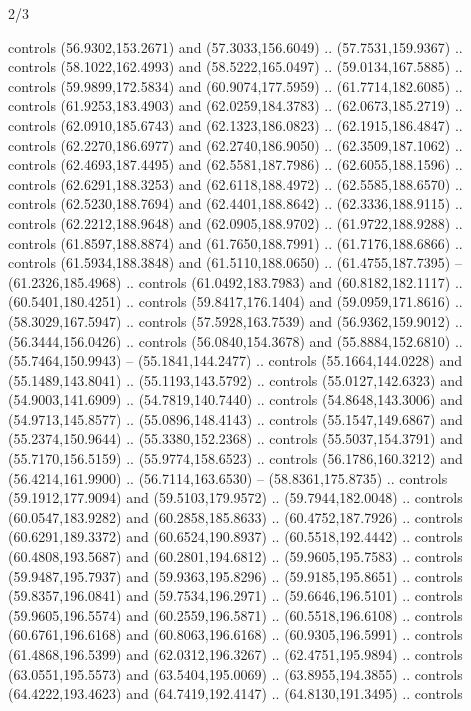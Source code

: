 \begin{flagdescription}{2/3}
\begin{scope}[shift={(0.5\flaglength,0.5)},scale=\flagwidth/320]
\begin{scope}[y=0.8pt, x=0.8pt, yscale=-1,shift={(-118.3,-146)}]
  controls (56.9302,153.2671) and (57.3033,156.6049) .. (57.7531,159.9367) ..
  controls (58.1022,162.4993) and (58.5222,165.0497) .. (59.0134,167.5885) ..
  controls (59.9899,172.5834) and (60.9074,177.5959) .. (61.7714,182.6085) ..
  controls (61.9253,183.4903) and (62.0259,184.3783) .. (62.0673,185.2719) ..
  controls (62.0910,185.6743) and (62.1323,186.0823) .. (62.1915,186.4847) ..
  controls (62.2270,186.6977) and (62.2740,186.9050) .. (62.3509,187.1062) ..
  controls (62.4693,187.4495) and (62.5581,187.7986) .. (62.6055,188.1596) ..
  controls (62.6291,188.3253) and (62.6118,188.4972) .. (62.5585,188.6570) ..
  controls (62.5230,188.7694) and (62.4401,188.8642) .. (62.3336,188.9115) ..
  controls (62.2212,188.9648) and (62.0905,188.9702) .. (61.9722,188.9288) ..
  controls (61.8597,188.8874) and (61.7650,188.7991) .. (61.7176,188.6866) ..
  controls (61.5934,188.3848) and (61.5110,188.0650) .. (61.4755,187.7395) --
  (61.2326,185.4968) .. controls (61.0492,183.7983) and (60.8182,182.1117) ..
  (60.5401,180.4251) .. controls (59.8417,176.1404) and (59.0959,171.8616) ..
  (58.3029,167.5947) .. controls (57.5928,163.7539) and (56.9362,159.9012) ..
  (56.3444,156.0426) .. controls (56.0840,154.3678) and (55.8884,152.6810) ..
  (55.7464,150.9943) -- (55.1841,144.2477) .. controls (55.1664,144.0228) and
  (55.1489,143.8041) .. (55.1193,143.5792) .. controls (55.0127,142.6323) and
  (54.9003,141.6909) .. (54.7819,140.7440) .. controls (54.8648,143.3006) and
  (54.9713,145.8577) .. (55.0896,148.4143) .. controls (55.1547,149.6867) and
  (55.2374,150.9644) .. (55.3380,152.2368) .. controls (55.5037,154.3791) and
  (55.7170,156.5159) .. (55.9774,158.6523) .. controls (56.1786,160.3212) and
  (56.4214,161.9900) .. (56.7114,163.6530) -- (58.8361,175.8735) .. controls
  (59.1912,177.9094) and (59.5103,179.9572) .. (59.7944,182.0048) .. controls
  (60.0547,183.9282) and (60.2858,185.8633) .. (60.4752,187.7926) .. controls
  (60.6291,189.3372) and (60.6524,190.8937) .. (60.5518,192.4442) .. controls
  (60.4808,193.5687) and (60.2801,194.6812) .. (59.9605,195.7583) .. controls
  (59.9487,195.7937) and (59.9363,195.8296) .. (59.9185,195.8651) .. controls
  (59.8357,196.0841) and (59.7534,196.2971) .. (59.6646,196.5101) .. controls
  (59.9605,196.5574) and (60.2559,196.5871) .. (60.5518,196.6108) .. controls
  (60.6761,196.6168) and (60.8063,196.6168) .. (60.9305,196.5991) .. controls
  (61.4868,196.5399) and (62.0312,196.3267) .. (62.4751,195.9894) .. controls
  (63.0551,195.5573) and (63.5404,195.0069) .. (63.8955,194.3855) .. controls
  (64.4222,193.4623) and (64.7419,192.4147) .. (64.8130,191.3495) .. controls

\end{scope}
\end{scope}
\end{flagdescription}
